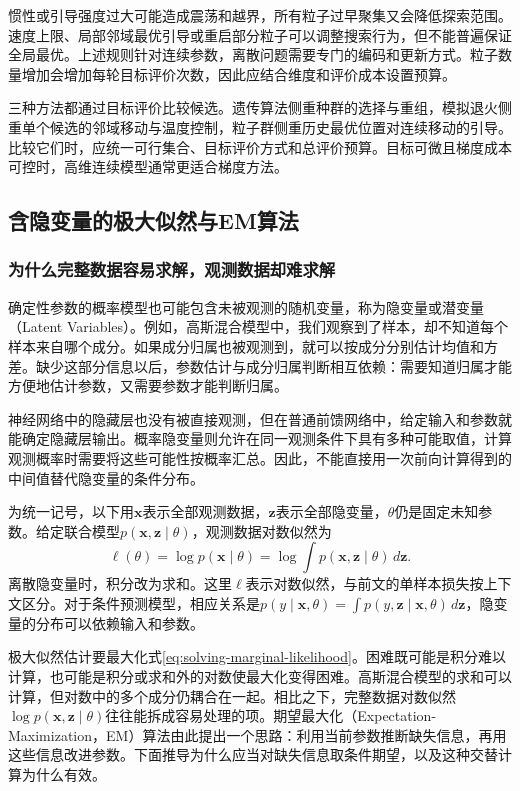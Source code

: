 惯性或引导强度过大可能造成震荡和越界，所有粒子过早聚集又会降低探索范围。速度上限、局部邻域最优引导或重启部分粒子可以调整搜索行为，但不能普遍保证全局最优。上述规则针对连续参数，离散问题需要专门的编码和更新方式。粒子数量增加会增加每轮目标评价次数，因此应结合维度和评价成本设置预算。

三种方法都通过目标评价比较候选。遗传算法侧重种群的选择与重组，模拟退火侧重单个候选的邻域移动与温度控制，粒子群侧重历史最优位置对连续移动的引导。比较它们时，应统一可行集合、目标评价方式和总评价预算。目标可微且梯度成本可控时，高维连续模型通常更适合梯度方法。

\subsection{含隐变量的极大似然与EM算法}

\subsubsection{为什么完整数据容易求解，观测数据却难求解}
确定性参数的概率模型也可能包含未被观测的随机变量，称为隐变量或潜变量（Latent Variables）。例如，高斯混合模型中，我们观察到了样本，却不知道每个样本来自哪个成分。如果成分归属也被观测到，就可以按成分分别估计均值和方差。缺少这部分信息以后，参数估计与成分归属判断相互依赖：需要知道归属才能方便地估计参数，又需要参数才能判断归属。

神经网络中的隐藏层也没有被直接观测，但在普通前馈网络中，给定输入和参数就能确定隐藏层输出。概率隐变量则允许在同一观测条件下具有多种可能取值，计算观测概率时需要将这些可能性按概率汇总。因此，不能直接用一次前向计算得到的中间值替代隐变量的条件分布。

为统一记号，以下用$\bm x$表示全部观测数据，$\bm z$表示全部隐变量，$\theta$仍是固定未知参数。给定联合模型$p(\bm x,\bm z\mid\theta)$，观测数据对数似然为
\begin{equation}
 \ell(\theta)=\log p(\bm x\mid\theta)
 =\log\int p(\bm x,\bm z\mid\theta)\,d\bm z.
 \label{eq:solving-marginal-likelihood}
\end{equation}
离散隐变量时，积分改为求和。这里$\ell$表示对数似然，与前文的单样本损失按上下文区分。对于条件预测模型，相应关系是$p(y\mid\bm x,\theta)=\int p(y,\bm z\mid\bm x,\theta)\,d\bm z$，隐变量的分布可以依赖输入和参数。

极大似然估计要最大化式\eqref{eq:solving-marginal-likelihood}。困难既可能是积分难以计算，也可能是积分或求和外的对数使最大化变得困难。高斯混合模型的求和可以计算，但对数中的多个成分仍耦合在一起。相比之下，完整数据对数似然$\log p(\bm x,\bm z\mid\theta)$往往能拆成容易处理的项。期望最大化（Expectation-Maximization，EM）算法由此提出一个思路：利用当前参数推断缺失信息，再用这些信息改进参数。下面推导为什么应当对缺失信息取条件期望，以及这种交替计算为什么有效。

